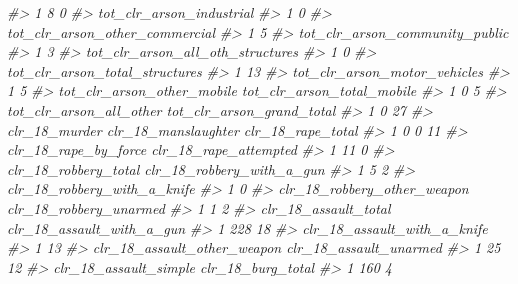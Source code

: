 \documentclass[
]{krantz}
\makeatletter
\newenvironment{Shaded}{\begin{snugshade}}{\end{snugshade}}
\newcommand{\CommentTok}[1]{\textcolor[rgb]{0.37,0.37,0.37}{\textit{#1}}}
\newenvironment{kframe}{%
\medskip{}
\setlength{\fboxsep}{.8em}
 \def\at@end@of@kframe{}%
 \ifinner\ifhmode%
  \def\at@end@of@kframe{\end{minipage}}%
  \begin{minipage}{\columnwidth}%
 \fi\fi%
 \def\FrameCommand##1{\hskip\@totalleftmargin \hskip-\fboxsep
 \colorbox{shadecolor}{##1}\hskip-\fboxsep
     \hskip-\linewidth \hskip-\@totalleftmargin \hskip\columnwidth}%
 \MakeFramed {\advance\hsize-\width
   \@totalleftmargin\z@ \linewidth\hsize
   \@setminipage}}%
 {\par\unskip\endMakeFramed%
 \at@end@of@kframe}
\renewenvironment{Shaded}{\begin{kframe}}{\end{kframe}}
\makeatother
\begin{document}
\begin{Shaded}
\begin{Highlighting}[]
\CommentTok{\#\textgreater{} 1                               8                     0}
\CommentTok{\#\textgreater{}   tot\_clr\_arson\_industrial}
\CommentTok{\#\textgreater{} 1                        0}
\CommentTok{\#\textgreater{}   tot\_clr\_arson\_other\_commercial}
\CommentTok{\#\textgreater{} 1                              5}
\CommentTok{\#\textgreater{}   tot\_clr\_arson\_community\_public}
\CommentTok{\#\textgreater{} 1                              3}
\CommentTok{\#\textgreater{}   tot\_clr\_arson\_all\_oth\_structures}
\CommentTok{\#\textgreater{} 1                                0}
\CommentTok{\#\textgreater{}   tot\_clr\_arson\_total\_structures}
\CommentTok{\#\textgreater{} 1                             13}
\CommentTok{\#\textgreater{}   tot\_clr\_arson\_motor\_vehicles}
\CommentTok{\#\textgreater{} 1                            5}
\CommentTok{\#\textgreater{}   tot\_clr\_arson\_other\_mobile tot\_clr\_arson\_total\_mobile}
\CommentTok{\#\textgreater{} 1                          0                          5}
\CommentTok{\#\textgreater{}   tot\_clr\_arson\_all\_other tot\_clr\_arson\_grand\_total}
\CommentTok{\#\textgreater{} 1                       0                        27}
\CommentTok{\#\textgreater{}   clr\_18\_murder clr\_18\_manslaughter clr\_18\_rape\_total}
\CommentTok{\#\textgreater{} 1             0                   0                11}
\CommentTok{\#\textgreater{}   clr\_18\_rape\_by\_force clr\_18\_rape\_attempted}
\CommentTok{\#\textgreater{} 1                   11                     0}
\CommentTok{\#\textgreater{}   clr\_18\_robbery\_total clr\_18\_robbery\_with\_a\_gun}
\CommentTok{\#\textgreater{} 1                    5                         2}
\CommentTok{\#\textgreater{}   clr\_18\_robbery\_with\_a\_knife}
\CommentTok{\#\textgreater{} 1                           0}
\CommentTok{\#\textgreater{}   clr\_18\_robbery\_other\_weapon clr\_18\_robbery\_unarmed}
\CommentTok{\#\textgreater{} 1                           1                      2}
\CommentTok{\#\textgreater{}   clr\_18\_assault\_total clr\_18\_assault\_with\_a\_gun}
\CommentTok{\#\textgreater{} 1                  228                        18}
\CommentTok{\#\textgreater{}   clr\_18\_assault\_with\_a\_knife}
\CommentTok{\#\textgreater{} 1                          13}
\CommentTok{\#\textgreater{}   clr\_18\_assault\_other\_weapon clr\_18\_assault\_unarmed}
\CommentTok{\#\textgreater{} 1                          25                     12}
\CommentTok{\#\textgreater{}   clr\_18\_assault\_simple clr\_18\_burg\_total}
\CommentTok{\#\textgreater{} 1                   160                 4}

\end{Highlighting}
\end{Shaded}
\end{document}
